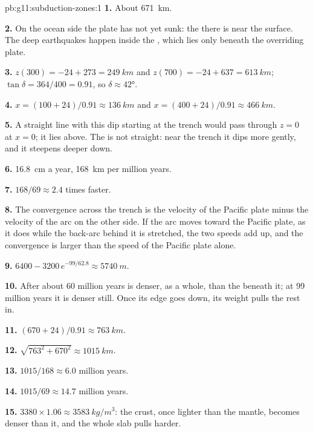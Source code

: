 \begin{solution}{pb:g11:subduction-zones:1}
\textbf{1.} About \qty{671}{km}.

\textbf{2.} On the ocean side the plate has not yet sunk: the 
there is near the surface. The deep earthquakes happen inside the , which
lies only beneath the overriding plate.

\textbf{3.} $z(300) = -24 + 273 = \qty{249}{km}$ and
$z(700) = -24 + 637 = \qty{613}{km}$; $\tan\delta = 364/400 = 0.91$, so
$\delta \approx \ang{42}$.

\textbf{4.} $x = (100 + 24)/0.91 \approx \qty{136}{km}$ and
$x = (400 + 24)/0.91 \approx \qty{466}{km}$.

\textbf{5.} A straight line with this dip starting at the trench would pass
through $z = 0$ at $x = 0$; it lies above. The  is not straight: near the
trench it dips more gently, and it steepens deeper down.

\textbf{6.} \qty{16.8}{cm} a year, \qty{168}{km} per million years.

\textbf{7.} $168/69 \approx 2.4$ times faster.

\textbf{8.} The convergence across the trench is the velocity of the Pacific
plate minus the velocity of the arc on the other side. If the arc moves toward
the Pacific plate, as it does while the back-arc behind it is stretched, the
two speeds add up, and the convergence is larger than the speed of the
Pacific plate alone.

\textbf{9.} $6400 - 3200\,e^{-99/62.8} \approx \qty{5740}{m}$.

\textbf{10.} After about 60 million years  is denser, as a
whole, than the  beneath it; at 99 million years it is denser
still. Once its edge goes down, its weight pulls the rest in.

\textbf{11.} $(670 + 24)/0.91 \approx \qty{763}{km}$.

\textbf{12.} $\sqrt{763^2 + 670^2} \approx \qty{1015}{km}$.

\textbf{13.} $1015/168 \approx 6.0$ million years.

\textbf{14.} $1015/69 \approx 14.7$ million years.

\textbf{15.} $3380 \times 1.06 \approx \qty{3583}{kg/m^3}$: the crust, once
lighter than the mantle, becomes denser than it, and the whole slab pulls
harder.


\end{solution}
